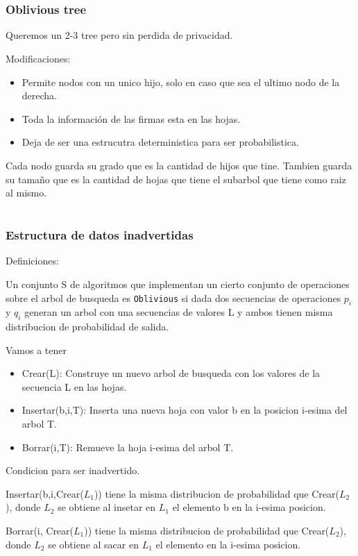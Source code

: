 \documentclass[10pt]{beamer}
\begin{document}

\section{}
\begin{frame}
\frametitle{Oblivious tree}

Queremos un 2-3 tree pero sin perdida de privacidad.

Modificaciones:
\begin{itemize}
  \item Permite nodos con un unico hijo, solo en caso que sea el ultimo nodo de la derecha.
  \item Toda la información de las firmas esta en las hojas.
  \item Deja de ser una estrucutra deterministica para ser probabilistica.
\end{itemize}

Cada nodo guarda su grado que es la cantidad de hijos que tine.
Tambien guarda su tamaño que es la cantidad de hojas que tiene el subarbol que tiene como
raiz al mismo.
\end{frame}



\section{}
\begin{frame}
\frametitle{Estructura de datos inadvertidas}

Definiciones:

Un conjunto S de algoritmos que implementan un cierto conjunto de operaciones sobre el arbol de busqueda es
\texttt{Oblivious} si dada dos secuencias de operaciones $p_i$ y $q_i$ generan un arbol con una secuencias
de valores L y ambos tienen misma distribucion de probabilidad de salida.


Vamos a tener
\begin{itemize}
  \item Crear(L): Construye un nuevo arbol de busqueda con los valores de la secuencia L en las hojas.
  \item Insertar(b,i,T): Inserta una nueva hoja con valor b en la posicion i-esima del arbol T.
  \item Borrar(i,T): Remueve la hoja i-esima del arbol T.
\end{itemize}

Condicion para ser inadvertido.

Insertar(b,i,Crear($L_1$)) tiene la misma distribucion de probabilidad que Crear($L_2$), donde $L_{2}$
se obtiene al insetar en $L_{1}$ el elemento b en la i-esima posicion.

Borrar(i, Crear($L_{1}$)) tiene la misma distribucion de probabilidad que Crear($L_2$), donde $L_{2}$
se obtiene al sacar en $L_{1}$ el elemento en la i-esima posicion.


\end{frame}
\end{document}
